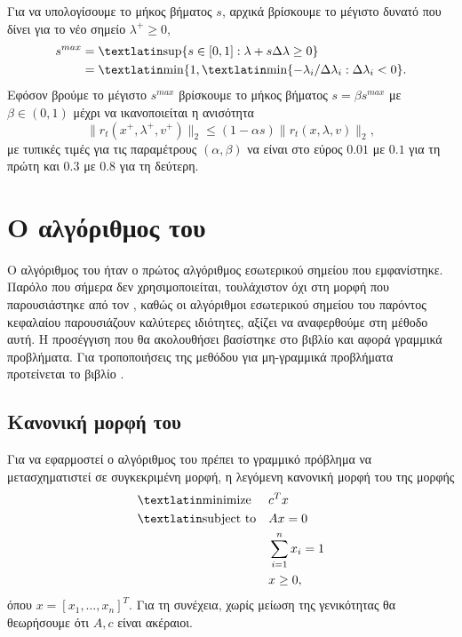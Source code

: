 Για να υπολογίσουμε το μήκος βήματος \( s \), αρχικά βρίσκουμε το μέγιστο δυνατό
που δίνει για το νέο σημείο \( \lambda^+ \geq 0 \),
\begin{align*}
    s^{max} &= \mathtxt{sup}\{s \in [0,1] : \lambda + s \Delta \lambda \geq 0 \}
    \\
    &= \mathtxt{min}\{1, \mathtxt{min}\{ -\lambda_i/\Delta \lambda_i: \Delta
        \lambda_i < 0 \}.
\end{align*}
Εφόσον βρούμε το μέγιστο \( s^{max} \) βρίσκουμε το μήκος βήματος \( s = \beta
s^{max} \) με \( \beta \in (0, 1) \) μέχρι να ικανοποιείται η ανισότητα
\begin{equation*}
    \| r_t(x^+, \lambda^+, v^+) \|_2 \leq (1 - \alpha s) \|r_t(x, \lambda, v) \|_2,
\end{equation*}
με τυπικές τιμές για τις παραμέτρους \( (\alpha, \beta) \) να είναι στο εύρος \(
0.01\) με \(0.1\) για τη πρώτη και \( 0.3\) με \(0.8\) για τη δεύτερη.

\section{Ο αλγόριθμος του }
Ο αλγόριθμος του  ήταν ο πρώτος αλγόριθμος εσωτερικού σημείου που
εμφανίστηκε. Παρόλο που σήμερα δεν χρησιμοποιείται, τουλάχιστον όχι στη μορφή
που παρουσιάστηκε από τον , καθώς οι αλγόριθμοι
εσωτερικού σημείου του παρόντος κεφαλαίου παρουσιάζουν
καλύτερες ιδιότητες, αξίζει να αναφερθούμε στη μέθοδο αυτή. Η προσέγγιση
που θα ακολουθήσει βασίστηκε στο βιβλίο \cite{chong2010} και αφορά γραμμικά
προβλήματα. Για τροποποιήσεις της μεθόδου για μη-γραμμικά προβλήματα προτείνεται
το βιβλίο \cite{nesterov1994interior}.

\subsection{Κανονική μορφή του }
Για να εφαρμοστεί ο αλγόριθμος του  πρέπει το γραμμικό πρόβλημα να
μετασχηματιστεί σε συγκεκριμένη μορφή, η λεγόμενη κανονική μορφή του
 της μορφής
\begin{equation*}
    \begin{aligned}
        & {\text{\tl{minimize}}}
        & & c^T x \\
        & \text{\tl{subject to}}
        & & A x = 0 \\
        &&& \sum_{i=1}^n x_i = 1 \\
        &&& x \ge 0,
    \end{aligned}
\end{equation*}
όπου \( x = [x_1, \dots, x_n]^T \). Για τη συνέχεια, χωρίς μείωση της
γενικότητας θα θεωρήσουμε ότι \( A, c\) είναι ακέραιοι.

